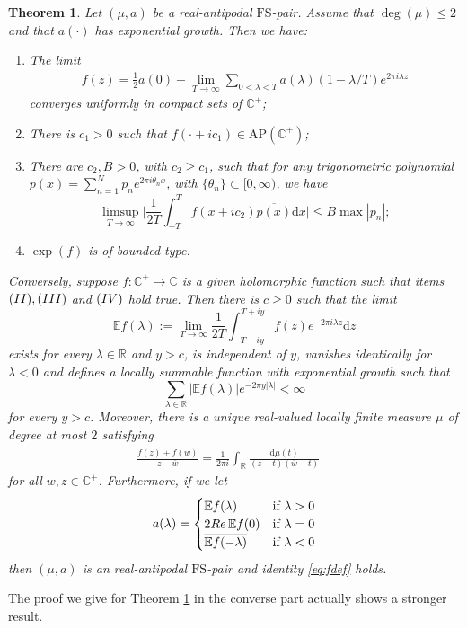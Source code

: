 \documentclass[a4paper,reqno,12pt]{amsart}
\newtheorem{theorem}{Theorem}
\newcommand{\E}{\mathcal{E}}
\renewcommand{\H}{\mathbb{C}^+}
\renewcommand{\r}{\mathbb{R}}
\newcommand{\cp}{\mathbb{C}} %
\newcommand{\la}{\lambda}
\renewcommand{\d}{\mathrm{d}}
\newcommand{\w}{\ov{w}}
\newcommand{\1}{{\bf 1}}
\newcommand{\apc}{\mathrm{AP}(\H)}
\newcommand{\fs}{\mathrm{FS}}
\renewcommand{\E}{\mathbb{E}}
\newcommand{\ov}[1]{\overline{#1}}
\renewcommand{\1}{{\bo 1}}
\renewcommand{\Re}{{\rm Re}\,}
\renewcommand{\a}{a(\cdot)}
\begin{document}
\begin{theorem}\label{thm:maineven}
Let $(\mu,a)$ be a real-antipodal $\fs$-pair. Assume that $\deg(\mu)\leq 2$ and that $\a$ has exponential growth. Then we have:
\begin{enumerate}
\item[(I)] The limit
\begin{align}\label{eq:fdef}
f(z) =\frac{1}2 a(0) +  \lim_{T\to \infty} \sum_{0<\la<T} a(\la) (1-\la/T) e^{2\pi i \la z}
\end{align}
converges uniformly in compact sets of $\H$;
\item[(II)] There is $c_1>0$ such that $f(\cdot+ic_1) \in \apc$;
\item[(III)] There are $c_2,B>0$, with $c_2\geq c_1$, such that for any trigonometric polynomial $p(x)=\sum_{n=1}^N p_n e^{2\pi i \theta_n x}$, with $\{\theta_n\} \subset [0,\infty)$, we have
$$
\limsup_{T\to\infty} \bigg|\frac{1}{2T}\int_{-T}^T f(x+ic_2)\ov{p(x)}\d x\bigg| \leq B \max |p_n|;
$$
\item[(IV)]  $\exp(f)$ is of bounded type.
\end{enumerate}
Conversely, suppose $f:\H \to \cp$ is a given holomorphic function such that items $({\rm II}), ({\rm III})$ and $({\rm IV})$ hold true. Then there is $c\geq 0$ such that the limit
$$
\E f(\la) := \lim_{T\to\infty} \frac{1}{2T}\int_{-T+iy}^{T+iy} f(z)e^{-2\pi i \la z}\d z
$$
exists for every $\la\in\r$ and $y>c$, is independent of $y$, vanishes identically for $\la<0$ and defines a locally summable function with exponential growth such that
$$
\sum_{\la\in \r} |\E f(\la)|e^{-2\pi y |\la|} < \infty
$$
for every $y>c$. Moreover, there is a unique real-valued locally finite measure $\mu$ of degree at most $2$ satisfying
\begin{align}\label{eq:repkerLphiid}
\frac{f(z)+\ov{f(w)}}{z-\w} = \frac{1}{2\pi i} \int_\r \frac{\d \mu(t)}{(z-t)(\w -t)} \quad 
\end{align}
for all $w,z\in \H$. Furthermore, if we let
\begin{align}\label{eq:adef}
a(\la)=\begin{cases} \E f(\la) &\mbox{if } \la>0 \\ 
2\Re \E f(0) &\mbox{if } \la=0 \\
 \ov{\E f(-\la)} &\mbox{if } \la<0
\end{cases}
\end{align}
then $(\mu,a)$ is an real-antipodal $\fs$-pair and identity \eqref{eq:fdef} holds.
\end{theorem}
The proof we give for Theorem \ref{thm:maineven} in the converse part actually shows a stronger result.
\end{document}
